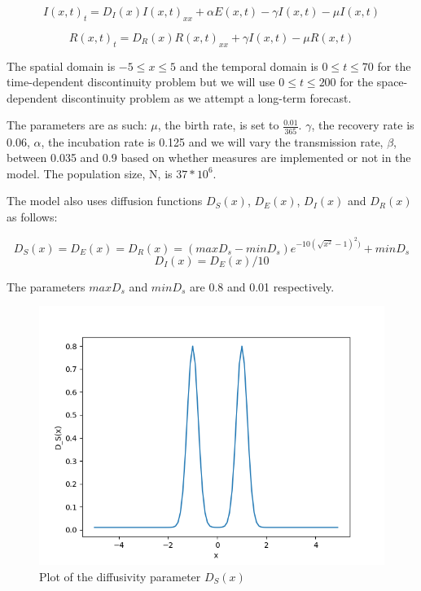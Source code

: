 \documentclass{article}
\begin{document}
\begin{equation}
I(x, t)_t = D_I(x)I(x, t)_{xx} + \alpha E(x, t) - \gamma I(x, t) - \mu I(x, t)
\end{equation}

\begin{equation}
R(x, t)_t = D_R(x)R(x, t)_{xx} + \gamma I(x, t) - \mu R(x, t)
\end{equation} 

The spatial domain is $-5 \leq x \leq 5$ and the temporal domain is $0 \leq t \leq 70$ for the time-dependent discontinuity problem but we will use $0 \leq t \leq 200$ for the space-dependent discontinuity problem as we attempt a long-term forecast.

The parameters are as such: $\mu$, the birth rate, is set to $\frac{0.01}{365}$. $\gamma$, the recovery rate is 0.06, $\alpha$, the incubation rate is 0.125 and we will vary the transmission rate, $\beta$, between 0.035 and 0.9 based on whether measures are implemented or not in the model. The population size, N, is $37*10^{6}$.

The model also uses diffusion functions $D_S(x)$, $D_E(x)$, $D_I(x)$ and $D_R(x)$ as follows:

\begin{equation}
D_S(x) = D_E(x) = D_R(x) = (maxD_s - minD_s)e^{-10(\sqrt{x^{2}} - 1)^2)} + minD_s
\end{equation} 
\begin{equation}
D_I(x) = D_E(x)/10
\end{equation}

The parameters $maxD_s$ and $minD_s$ are 0.8 and 0.01 respectively. 

\begin{figure}[H]
\centering
\includegraphics[width=0.7\linewidth]{./figures/pde_D_s}
\caption{Plot of the diffusivity parameter $D_S(x)$}
\label{fig:pde_D_s}
\end{figure}
\end{document}
